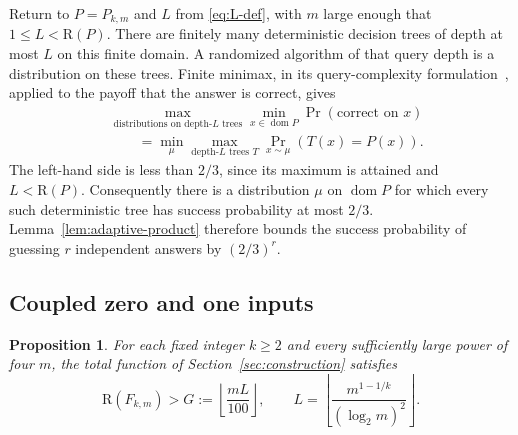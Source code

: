 \documentclass[11pt]{article}
\newtheorem{proposition}[theorem]{Proposition}
\theoremstyle{definition}
\newcommand{\R}{\mathrm R}
\begin{document}
Return to $P=P_{k,m}$ and $L$ from \eqref{eq:L-def}, with $m$ large
enough that $1\leq L<\R(P)$.  There are finitely many deterministic
decision trees of depth at most $L$ on this finite domain.  A randomized
algorithm of that query depth is a distribution on these trees. Finite
minimax, in its query-complexity formulation~\cite{Yao77}, applied to the
payoff that the answer is correct, gives
\[
 \begin{aligned}
 &\max_{\text{distributions on depth-$L$ trees}}
       \min_{x\in\operatorname{dom}P}\Pr(\text{correct on }x)\\
 &\hspace{2em}=
 \min_{\mu}\max_{\text{depth-$L$ trees }T}
       \Pr_{x\sim\mu}(T(x)=P(x)).
 \end{aligned}
\]
The left-hand side is less than $2/3$, since its maximum is attained
and $L<\R(P)$.  Consequently there is a distribution $\mu$ on
$\operatorname{dom}P$ for which every such deterministic tree has
success probability at most $2/3$.  Lemma~\ref{lem:adaptive-product}
therefore bounds the success probability of guessing $r$ independent
answers by $(2/3)^r$.

\subsection{Coupled zero and one inputs}

\begin{proposition}\label{prop:classical}
For each fixed integer $k\geq2$ and every sufficiently large power of
four $m$, the total function of Section~\ref{sec:construction} satisfies
\begin{equation}\label{eq:classical-lower}
 \R(F_{k,m})>
 G:=\left\lfloor\frac{mL}{100}\right\rfloor,
 \qquad
 L=\left\lfloor\frac{m^{1-1/k}}{(\log_2m)^2}\right\rfloor.
\end{equation}
\end{proposition}
\end{document}
